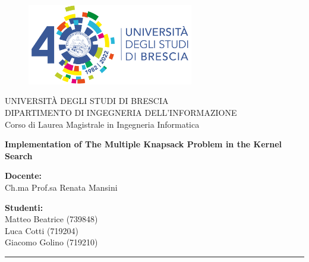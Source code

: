 \begin{titlepage}
    \begin{figure}[H] %
        \centering
        \includegraphics[width=72.4mm]{images/logo_unibs}
    \end{figure}

    \begin{center}
        \LARGE{\uppercase{Università degli Studi di Brescia}}\\ %
        \vspace{5mm} %
        \large{\uppercase{Dipartimento di Ingegneria dell'informazione}}\\
        \vspace{5mm}
        \large{Corso di Laurea Magistrale in Ingegneria Informatica}\\
    \end{center}

    \vspace{10mm}

    \begin{center}
        \LARGE{\textbf{Implementation of The Multiple Knapsack Problem in the Kernel Search}}\\
    \end{center}

    \vspace{10mm}

    \begin{flushleft}
        \large
        \textbf{Docente:}\\
        Ch.ma Prof.sa Renata Mansini
    \end{flushleft}

    \begin{flushright}
        \large
        \textbf{Studenti:}\\
        Matteo Beatrice (739848)\\
        Luca Cotti (719204)\\
        Giacomo Golino (719210)
    \end{flushright}

    \vspace*{\fill} %

    \rule{0.8\textwidth}{0.6pt}\\ %
\end{titlepage}
